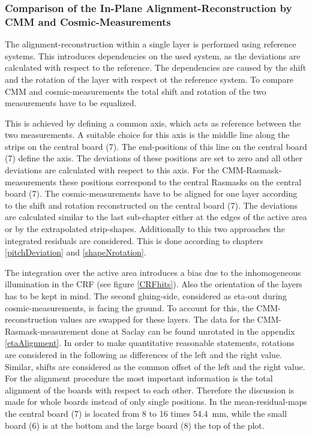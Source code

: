 \documentclass[
twoside,            %
BCOR1.4cm,          %
10pt,               %
headings=normal,    %
headsepline,        %
clearplainpage,		%
final,              %
div=14,
open=right,
bibliography=toc
]{scrreprt}
\begin{document}

\subsubsection{Comparison of the In-Plane Alignment-Reconstruction by CMM and Cosmic-Measurements}

The alignment-reconstruction within a single layer is performed using reference systems.
This introduces dependencies on the used system, as the deviations are calculated with respect to the reference.
The dependencies are caused by the shift and the rotation of the layer with respect ot the reference system.
To compare CMM and cosmic-measurements the total shift and rotation of the two measurements have to be equalized.

This is achieved by defining a common axis, which acts as reference between the two measurements.
A suitable choice for this axis is the middle line along the strips on the central board (7).
The end-positions of this line on the central board (7) define the axis.
The deviations of these positions are set to zero and all other deviations are calculated with respect to this axis.
For the CMM-Rasmask-measurements these positions correspond to the central Rasmasks on the central board (7).
The cosmic-measurements have to be aligned for one layer according to the shift and rotation reconstructed on the central board (7).
The deviations are calculated similar to the last sub-chapter either at the edges of the active area or by the extrapolated strip-shapes.
Additionally to this two approaches the integrated residuals are considered.
This is done according to chapters \ref{pitchDeviation} and \ref{shapeNrotation}.

The integration over the active area introduces a bias due to the inhomogeneous illumination in the CRF (see figure \ref{CRFhits}).
Also the orientation of the layers has to be kept in mind.
The second gluing-side, considered as eta-out during cosmic-measurements, is facing the ground.
To account for this, the CMM-reconstruction values are swapped for these layers.
The data for the CMM-Rasmask-measurement done at Saclay can be found unrotated in the appendix \ref{etaAlignment}.
%
In order to make quantitative reasonable statements, rotations are considered in the following as differences of the left and the right value.
Similar, shifts are considered as the common offset of the left and the right value.
For the alignment procedure the most important information is the total alignment of the boards with respect to each other.
Therefore the discussion is made for whole boards instead of only single positions.
In the mean-residual-maps the central board (7) is located from 8 to 16 times \SI{54.4}{mm}, while the small board (6) is at the bottom and the large board (8) the top of the plot.
\end{document}
